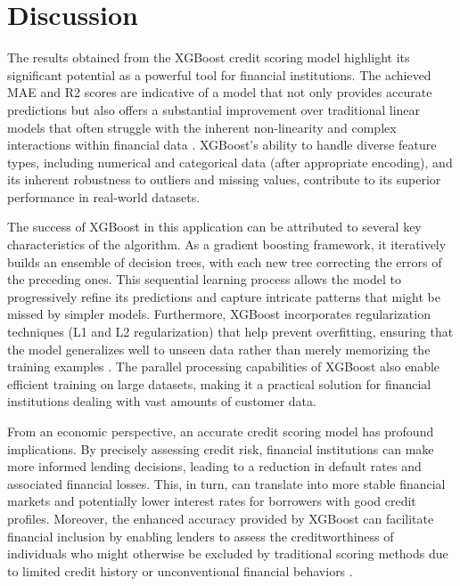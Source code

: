 \documentclass{article}
\begin{document}
\section{Discussion}

The results obtained from the XGBoost credit scoring model highlight its significant potential as a powerful tool for financial institutions. The achieved MAE and R2 scores are indicative of a model that not only provides accurate predictions but also offers a substantial improvement over traditional linear models that often struggle with the inherent non-linearity and complex interactions within financial data \cite{siddiqi2017credit}. XGBoost's ability to handle diverse feature types, including numerical and categorical data (after appropriate encoding), and its inherent robustness to outliers and missing values, contribute to its superior performance in real-world datasets.

The success of XGBoost in this application can be attributed to several key characteristics of the algorithm. As a gradient boosting framework, it iteratively builds an ensemble of decision trees, with each new tree correcting the errors of the preceding ones. This sequential learning process allows the model to progressively refine its predictions and capture intricate patterns that might be missed by simpler models. Furthermore, XGBoost incorporates regularization techniques (L1 and L2 regularization) that help prevent overfitting, ensuring that the model generalizes well to unseen data rather than merely memorizing the training examples \cite{friedman2001greedy}. The parallel processing capabilities of XGBoost also enable efficient training on large datasets, making it a practical solution for financial institutions dealing with vast amounts of customer data.

From an economic perspective, an accurate credit scoring model has profound implications. By precisely assessing credit risk, financial institutions can make more informed lending decisions, leading to a reduction in default rates and associated financial losses. This, in turn, can translate into more stable financial markets and potentially lower interest rates for borrowers with good credit profiles. Moreover, the enhanced accuracy provided by XGBoost can facilitate financial inclusion by enabling lenders to assess the creditworthiness of individuals who might otherwise be excluded by traditional scoring methods due to limited credit history or unconventional financial behaviors \cite{worldbank2019global}.
\end{document}
